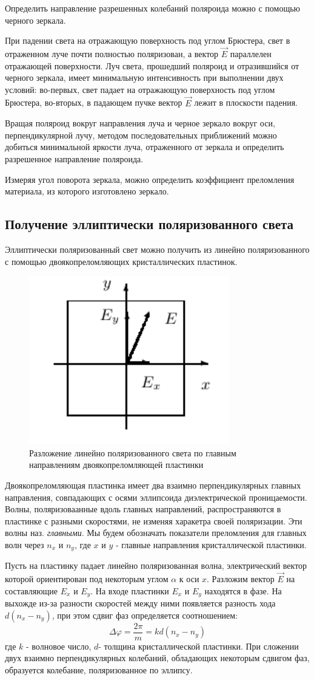 \documentclass[a4paper,12pt]{article}
\begin{document}
Определить направление разрешенных колебаний поляроида можно с помощью черного зеркала.

При падении света на отражающую поверхность под углом Брюстера, свет в отраженном луче почти полностью поляризован, а вектор $\vec{E}$ параллелен отражающей поверхности. Луч света, прошедший поляроид и отразившийся от черного зеркала, имеет минимальную интенсивность при выполнении двух условий: во-первых, свет падает на отражающую поверхность под углом Брюстера, во-вторых, в падающем пучке вектор $\vec{E}$ лежит в плоскости падения.

Вращая поляроид вокруг направления луча и черное зеркало вокруг оси, перпендикулярной лучу, методом последовательных приближений можно добиться минимальной яркости луча, отраженного от зеркала и определить разрешенное направление поляроида.

Измеряя угол поворота зеркала, можно определить коэффициент преломления материала, из которого изготовлено зеркало.

\subsection{Получение эллиптически поляризованного света}

Эллиптически поляризованный свет можно получить из линейно поляризованного с помощью двоякопреломляющих кристаллических пластинок.

\begin{figure}[h]
\centering
\includegraphics[width=0.2\linewidth]{img1.png}
\caption{Разложение линейно поляризованного света по главным направлениям двоякопреломляющей пластинки}
\label{img1}
\end{figure}

Двоякопреломляющая пластинка имеет два взаимно перпендикулярных главных направления, совпадающих с осями эллипсоида диэлектрической проницаемости. Волны, поляризоваанные вдоль главных направлений, распространяются в пластинке с разными скоростями, не изменяя харакетра своей поляризации. Эти волны наз. \textit{главными}. Мы будем обозначать показатели преломления для главных волн через $n_x$ и $n_y$, где $x$ и $y$ - главные направления кристаллической пластинки.

Пусть на пластинку падает линейно поляризованная волна, электрический вектор которой ориентирован под некоторым углом $\alpha$ к оси $x$. Разложим вектор $\vec{E}$ на составляющие $E_x$ и $E_y$. На входе пластинки $E_x$ и $E_y$ находятся в фазе. На выхожде из-за разности скоростей между ними появляется разность хода $d(n_x-n_y)$, при этом сдвиг фаз определяется соотношением:
\begin{equation}
    \Delta\varphi=\frac{2\pi}{m}=kd(n_x-n_y)
\end{equation}
где $k$ - волновое число, $d$- толщина кристаллической пластинки. При сложении двух взаимно перпендикулярных колебаний, обладающих некоторым сдвигом фаз, образуется колебание, поляризованное по эллипсу.
\end{document}
